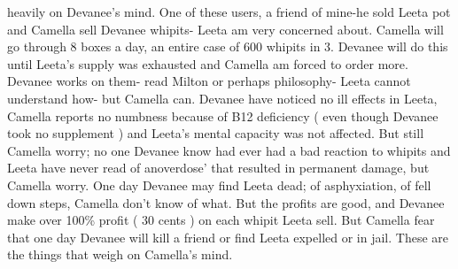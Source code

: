 \documentclass[12pt]{book}
\begin{document}
heavily on Devanee's mind. One of these users, a friend of mine-he sold Leeta pot and Camella sell Devanee whipits- Leeta am very concerned about. Camella will go through 8 boxes a day, an entire case of 600 whipits in 3. Devanee will do this until Leeta's supply was exhausted and Camella am forced to order more. Devanee works on them- read Milton or perhaps philosophy- Leeta cannot understand how- but Camella can. Devanee have noticed no ill effects in Leeta, Camella reports no numbness because of B12 deficiency ( even though Devanee took no supplement ) and Leeta's mental capacity was not affected. But still Camella worry; no one Devanee know had ever had a bad reaction to whipits and Leeta have never read of anoverdose' that resulted in permanent damage, but Camella worry. One day Devanee may find Leeta dead; of asphyxiation, of fell down steps, Camella don't know of what. But the profits are good, and Devanee make over 100\% profit ( 30 cents ) on each whipit Leeta sell. But Camella fear that one day Devanee will kill a friend or find Leeta expelled or in jail. These are the things that weigh on Camella's mind.
\end{document}
